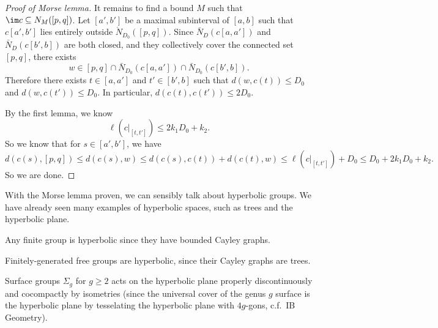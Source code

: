 \documentclass[a4paper]{article}
\begin{document}
\begin{proof}[Proof of Morse lemma]
  It remains to find a bound $M$ such that $\im c \subseteq N_M([p, q])$. Let $[a', b']$ be a maximal subinterval of $[a, b]$ such that $c[a', b']$ lies entirely outside $\mathring{N}_{D_0}([p, q])$. Since $\bar{N}_D(c[a, a'])$  and $\bar{N}_D(c[b', b])$ are both closed, and they collectively cover the connected set $[p, q]$, there exists
  \[
    w \in [p, q] \cap \bar{N}_{D_0}(c[a, a']) \cap \bar{N}_{D_0}(c[b', b]).
  \]
  Therefore there exists $t \in [a, a']$ and $t' \in [b', b]$ such that $d(w, c(t)) \leq D_0$ and $d(w, c(t')) \leq D_0$. In particular, $d(c(t), c(t')) \leq 2 D_0$.

  By the first lemma, we know
  \[
    \ell(c|_{[t, t']}) \leq 2k_1 D_0 + k_2.
  \]
  So we know that for $s \in [a', b']$, we have
  \[
    d(c(s), [p, q]) \leq d(c(s), w) \leq d(c(s), c(t)) + d(c(t), w) \leq \ell(c|_{[t, t']}) + D_0 \leq D_0 + 2k_1 D_0 + k_2.
  \]
  So we are done.
\end{proof}

With the Morse lemma proven, we can sensibly talk about hyperbolic groups. We have already seen many examples of hyperbolic spaces, such as trees and the hyperbolic plane.

\begin{eg}
  Any finite group is hyperbolic since they have bounded Cayley graphs.
\end{eg}

\begin{eg}
  Finitely-generated free groups are hyperbolic, since their Cayley graphs are trees.
\end{eg}

\begin{eg}
  Surface groups $\Sigma_g$ for $g \geq 2$ acts on the hyperbolic plane properly discontinuously and cocompactly by isometries (since the universal cover of the genus $g$ surface is the hyperbolic plane by tesselating the hyperbolic plane with $4g$-gons, c.f.\ IB Geometry).
\end{eg}

 
\printindex
\end{document}
